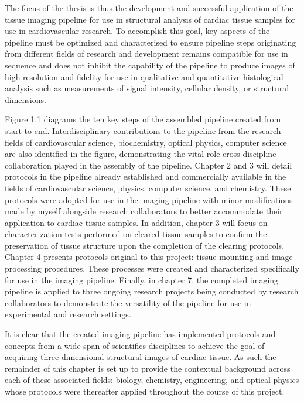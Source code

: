 The focus of the thesis is thus the development and successful application of the tissue imaging pipeline for use in structural analysis of cardiac tissue samples for use in cardiovascular research. To accomplish this goal, key aspects of the pipeline must be optimized and characterised to ensure pipeline steps originating from different fields of research and development remains compatible for use in sequence and does not inhibit the capability of the pipeline to produce images of high resolution and fidelity for use in qualitative and quantitative histological analysis such as measurements of signal intensity, cellular density, or structural dimensions.

Figure 1.1 diagrams the ten key steps of the assembled pipeline created from start to end. Interdisciplinary contributions to the pipeline from the research fields of cardiovascular science, biochemistry, optical physics, computer science are also identified in the figure, demonstrating the vital role cross discipline collaboration played in the assembly of the pipeline. Chapter 2 and 3 will detail protocols in the pipeline already established and commercially available in the fields of cardiovascular science, physics, computer science, and chemistry. These protocols were adopted for use in the imaging pipeline with minor modifications made by myself alongside research collaborators to better accommodate their application to cardiac tissue samples. In addition, chapter 3 will focus on characterization tests performed on cleared tissue samples to confirm the preservation of tissue structure upon the completion of the clearing protocols. Chapter 4 presents protocols original to this project: tissue mounting and image processing procedures. These processes were created and characterized specifically for use in the imaging pipeline. Finally, in chapter 7, the completed imaging pipeline is applied to three ongoing research projects being conducted by research collaborators to demonstrate the versatility of the pipeline for use in experimental and research settings.

It is clear that the created imaging pipeline has implemented protocols and concepts from a wide span of scientifics disciplines to achieve the goal of acquiring three dimensional structural images of cardiac tissue. As such the remainder of this chapter is set up to provide the contextual background across each of these associated fields: biology, chemistry, engineering, and optical physics whose protocols were thereafter applied throughout the course of this project.

